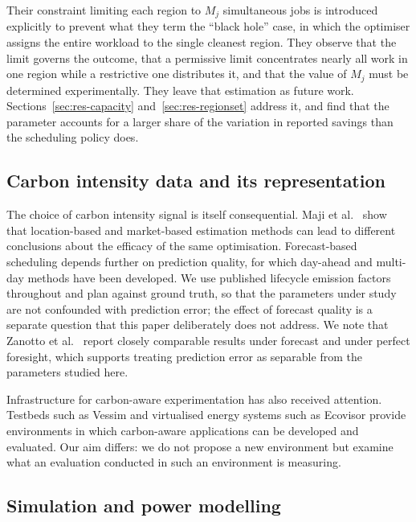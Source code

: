 Their constraint limiting each region to $M_j$ simultaneous jobs is introduced
explicitly to prevent what they term the ``black hole'' case, in which the
optimiser assigns the entire workload to the single cleanest region. They
observe that the limit governs the outcome, that a permissive limit concentrates
nearly all work in one region while a restrictive one distributes it, and that
the value of $M_j$ must be determined experimentally. They leave that estimation
as future work. Sections~\ref{sec:res-capacity} and~\ref{sec:res-regionset}
address it, and find that the parameter accounts for a larger share of the
variation in reported savings than the scheduling policy does.

\subsection{Carbon intensity data and its representation}

The choice of carbon intensity signal is itself consequential. Maji et
al.~\cite{maji2024greenmirage} show that location-based and market-based
estimation methods can lead to different conclusions about the efficacy of the
same optimisation. Forecast-based scheduling depends further on prediction
quality, for which day-ahead \cite{maji2022dacf} and multi-day
\cite{maji2022carboncast} methods have been developed. We use published
lifecycle emission factors throughout and plan against ground truth, so that
the parameters under study are not confounded with prediction error; the effect
of forecast quality is a separate question that this paper deliberately does not
address. We note that Zanotto et al.~\cite{zanotto2025usercentric} report
closely comparable results under forecast and under perfect foresight,
which supports treating prediction error as separable from the parameters
studied here.

Infrastructure for carbon-aware experimentation has also received attention.
Testbeds such as Vessim \cite{wiesner2023vessim} and virtualised energy systems
such as Ecovisor \cite{souza2023ecovisor} provide environments in which
carbon-aware applications can be developed and evaluated. Our aim differs: we do
not propose a new environment but examine what an evaluation conducted in such
an environment is measuring.

\subsection{Simulation and power modelling}

